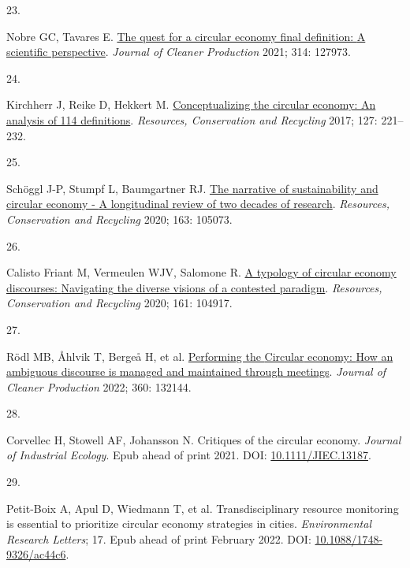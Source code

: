 \documentclass[
  12pt,
  a4paperpaper,
  onecolumn]{article}
\newlength{\cslhangindent}
\newlength{\csllabelwidth}
\newlength{\cslentryspacingunit} %
\newenvironment{CSLReferences}[2] %
 {%
  \setlength{\parindent}{0pt}
  \ifodd #1
  \let\oldpar\par
  \def\par{\hangindent=\cslhangindent\oldpar}
  \fi
  \setlength{\parskip}{#2\cslentryspacingunit}
 }%
 {}
\newcommand{\CSLLeftMargin}[1]{\parbox[t]{\csllabelwidth}{#1}}
\newcommand{\CSLRightInline}[1]{\parbox[t]{\linewidth - \csllabelwidth}{#1}\break}
\begin{document}
\begin{CSLReferences}{0}{0}
\leavevmode{}%
\CSLLeftMargin{23. }%
\CSLRightInline{Nobre GC, Tavares E.
\href{https://doi.org/10.1016/j.jclepro.2021.127973}{The quest for a
circular economy final definition: {A} scientific perspective}.
\emph{Journal of Cleaner Production} 2021; 314: 127973.}

\leavevmode{}%
\CSLLeftMargin{24. }%
\CSLRightInline{Kirchherr J, Reike D, Hekkert M.
\href{https://doi.org/10.1016/j.resconrec.2017.09.005}{Conceptualizing
the circular economy: {An} analysis of 114 definitions}.
\emph{Resources, Conservation and Recycling} 2017; 127: 221--232.}

\leavevmode{}%
\CSLLeftMargin{25. }%
\CSLRightInline{Schöggl J-P, Stumpf L, Baumgartner RJ.
\href{https://doi.org/10.1016/j.resconrec.2020.105073}{The narrative of
sustainability and circular economy - {A} longitudinal review of two
decades of research}. \emph{Resources, Conservation and Recycling} 2020;
163: 105073.}

\leavevmode{}%
\CSLLeftMargin{26. }%
\CSLRightInline{Calisto Friant M, Vermeulen WJV, Salomone R.
\href{https://doi.org/10.1016/j.resconrec.2020.104917}{A typology of
circular economy discourses: {Navigating} the diverse visions of a
contested paradigm}. \emph{Resources, Conservation and Recycling} 2020;
161: 104917.}

\leavevmode{}%
\CSLLeftMargin{27. }%
\CSLRightInline{Rödl MB, Åhlvik T, Bergeå H, et al.
\href{https://doi.org/10.1016/J.JCLEPRO.2022.132144}{Performing the
{Circular} economy: {How} an ambiguous discourse is managed and
maintained through meetings}. \emph{Journal of Cleaner Production} 2022;
360: 132144.}

\leavevmode{}%
\CSLLeftMargin{28. }%
\CSLRightInline{Corvellec H, Stowell AF, Johansson N. Critiques of the
circular economy. \emph{Journal of Industrial Ecology}. Epub ahead of
print 2021. DOI:
\href{https://doi.org/10.1111/JIEC.13187}{10.1111/JIEC.13187}.}

\leavevmode{}%
\CSLLeftMargin{29. }%
\CSLRightInline{Petit-Boix A, Apul D, Wiedmann T, et al.
Transdisciplinary resource monitoring is essential to prioritize
circular economy strategies in cities. \emph{Environmental Research
Letters}; 17. Epub ahead of print February 2022. DOI:
\href{https://doi.org/10.1088/1748-9326/ac44c6}{10.1088/1748-9326/ac44c6}.}


\end{CSLReferences}
\end{document}
